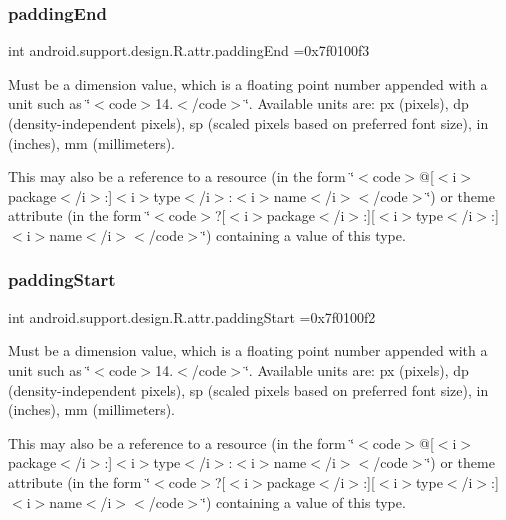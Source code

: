 \subsubsection{\texorpdfstring{padding\+End}{paddingEnd}}
{\footnotesize\ttfamily int android.\+support.\+design.\+R.\+attr.\+padding\+End =0x7f0100f3\hspace{0.3cm}{\ttfamily [static]}}

Must be a dimension value, which is a floating point number appended with a unit such as \char`\"{}$<$code$>$14.\+5sp$<$/code$>$\char`\"{}. Available units are\+: px (pixels), dp (density-\/independent pixels), sp (scaled pixels based on preferred font size), in (inches), mm (millimeters). 

This may also be a reference to a resource (in the form \char`\"{}$<$code$>$@\mbox{[}$<$i$>$package$<$/i$>$\+:\mbox{]}$<$i$>$type$<$/i$>$\+:$<$i$>$name$<$/i$>$$<$/code$>$\char`\"{}) or theme attribute (in the form \char`\"{}$<$code$>$?\mbox{[}$<$i$>$package$<$/i$>$\+:\mbox{]}\mbox{[}$<$i$>$type$<$/i$>$\+:\mbox{]}$<$i$>$name$<$/i$>$$<$/code$>$\char`\"{}) containing a value of this type. \mbox{\label{classandroid_1_1support_1_1design_1_1R_1_1attr_a0664bf5d1b33cdf9ca567e82b1006290}} 
\subsubsection{\texorpdfstring{padding\+Start}{paddingStart}}
{\footnotesize\ttfamily int android.\+support.\+design.\+R.\+attr.\+padding\+Start =0x7f0100f2\hspace{0.3cm}{\ttfamily [static]}}

Must be a dimension value, which is a floating point number appended with a unit such as \char`\"{}$<$code$>$14.\+5sp$<$/code$>$\char`\"{}. Available units are\+: px (pixels), dp (density-\/independent pixels), sp (scaled pixels based on preferred font size), in (inches), mm (millimeters). 

This may also be a reference to a resource (in the form \char`\"{}$<$code$>$@\mbox{[}$<$i$>$package$<$/i$>$\+:\mbox{]}$<$i$>$type$<$/i$>$\+:$<$i$>$name$<$/i$>$$<$/code$>$\char`\"{}) or theme attribute (in the form \char`\"{}$<$code$>$?\mbox{[}$<$i$>$package$<$/i$>$\+:\mbox{]}\mbox{[}$<$i$>$type$<$/i$>$\+:\mbox{]}$<$i$>$name$<$/i$>$$<$/code$>$\char`\"{}) containing a value of this type. \mbox{\label{classandroid_1_1support_1_1design_1_1R_1_1attr_ad363e0649bee876bc29776da9e7507e5}} 
